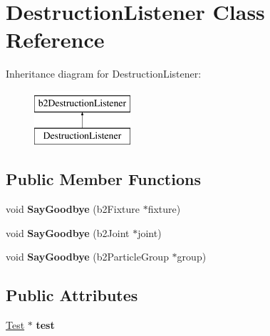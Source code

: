 \hypertarget{classDestructionListener}{\section{Destruction\-Listener Class Reference}
\label{classDestructionListener}
}
Inheritance diagram for Destruction\-Listener\-:\begin{figure}[H]
\begin{center}
\leavevmode
\includegraphics[height=2.000000cm]{classDestructionListener}
\end{center}
\end{figure}
\subsection*{Public Member Functions}
\begin{DoxyCompactItemize}
\item 
\hypertarget{classDestructionListener_a51b3b045b48c33fbfaa0182b329d5d49}{void {\bfseries Say\-Goodbye} (b2\-Fixture $\ast$fixture)}\label{classDestructionListener_a51b3b045b48c33fbfaa0182b329d5d49}

\item 
\hypertarget{classDestructionListener_a55627bd55b8816d66e0f3d85a75c0552}{void {\bfseries Say\-Goodbye} (b2\-Joint $\ast$joint)}\label{classDestructionListener_a55627bd55b8816d66e0f3d85a75c0552}

\item 
\hypertarget{classDestructionListener_abea64bded5c515eefa203242090d40e1}{void {\bfseries Say\-Goodbye} (b2\-Particle\-Group $\ast$group)}\label{classDestructionListener_abea64bded5c515eefa203242090d40e1}

\end{DoxyCompactItemize}
\subsection*{Public Attributes}
\begin{DoxyCompactItemize}
\item 
\hypertarget{classDestructionListener_ae6d64f92843225c30b053f942fa38402}{\hyperlink{classTest}{Test} $\ast$ {\bfseries test}}\label{classDestructionListener_ae6d64f92843225c30b053f942fa38402}

\end{DoxyCompactItemize}


